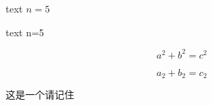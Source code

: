 \documentclass{article}
\begin{document}
text $n=5$

text n=5

    \begin{equation}
        a^2+b^2=c^2
    \end{equation}

    \begin{equation}
        a_2+b_2=c_2
    \end{equation}

这是一个请记住
\end{document}
